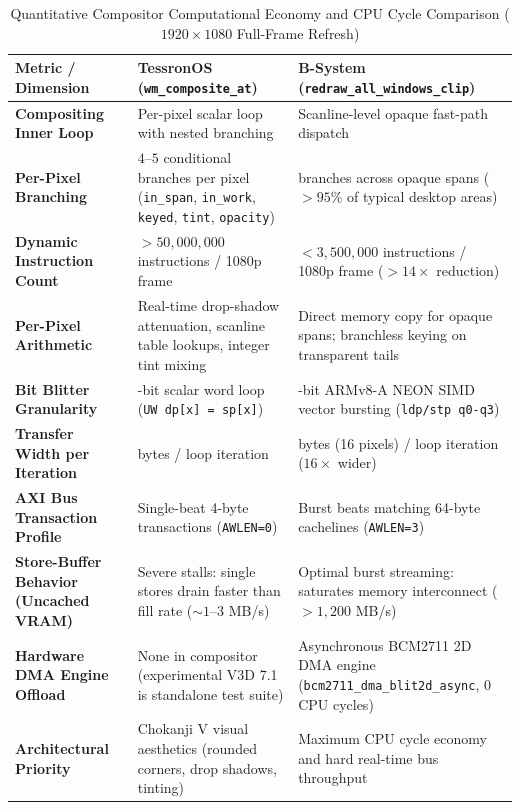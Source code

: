 \documentclass[10pt,journal,compsoc,twocolumn]{article}
\begin{document}
\begin{table}[t]
\centering
\caption{Quantitative Compositor Computational Economy and CPU Cycle Comparison ($1920 \times 1080$ Full-Frame Refresh)}
\label{tab:compositor_economy}
\scriptsize
\setlength{\tabcolsep}{5pt}
\renewcommand{\arraystretch}{1.12}
\begin{tabularx}{\textwidth}{@{} >{\raggedright\arraybackslash\bfseries}p{3.8cm} >{\raggedright\arraybackslash}X >{\raggedright\arraybackslash}X @{}}
\toprule
Metric / Dimension & TessronOS (\texttt{wm\_composite\_at}) & B-System (\texttt{redraw\_all\_windows\_clip}) \\
\midrule
Compositing Inner Loop & Per-pixel scalar loop with nested branching & Scanline-level opaque fast-path dispatch \\
Per-Pixel Branching & $4\text{--}5$ conditional branches per pixel (\texttt{in\_span}, \texttt{in\_work}, \texttt{keyed}, \texttt{tint}, \texttt{opacity}) & 0 branches across opaque spans ($>95\%$ of typical desktop areas) \\
Dynamic Instruction Count & $> 50{,}000{,}000$ instructions / 1080p frame & $< 3{,}500{,}000$ instructions / 1080p frame ($>14\times$ reduction) \\
Per-Pixel Arithmetic & Real-time drop-shadow attenuation, scanline table lookups, integer tint mixing & Direct memory copy for opaque spans; branchless keying on transparent tails \\
Bit Blitter Granularity & 32-bit scalar word loop (\texttt{UW dp[x] = sp[x]}) & 128-bit ARMv8-A NEON SIMD vector bursting (\texttt{ldp/stp q0-q3}) \\
Transfer Width per Iteration & 4 bytes / loop iteration & 64 bytes (16 pixels) / loop iteration ($16\times$ wider) \\
AXI Bus Transaction Profile & Single-beat 4-byte transactions (\texttt{AWLEN=0}) & Burst beats matching 64-byte cachelines (\texttt{AWLEN=3}) \\
Store-Buffer Behavior (Uncached VRAM) & Severe stalls: single stores drain faster than fill rate ($\sim 1\text{--}3$ MB/s) & Optimal burst streaming: saturates memory interconnect ($>1{,}200$ MB/s) \\
Hardware DMA Engine Offload & None in compositor (experimental V3D 7.1 is standalone test suite) & Asynchronous BCM2711 2D DMA engine (\texttt{bcm2711\_dma\_blit2d\_async}, 0 CPU cycles) \\
Architectural Priority & Chokanji V visual aesthetics (rounded corners, drop shadows, tinting) & Maximum CPU cycle economy and hard real-time bus throughput \\
\bottomrule
\end{tabularx}
\end{table}
\end{document}
